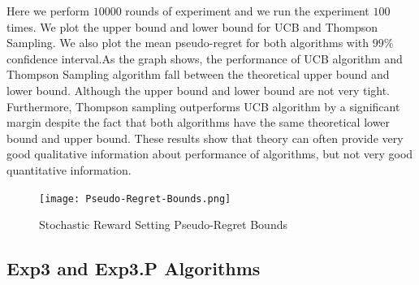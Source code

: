 \documentclass[12pt]{article}
\begin{document}
Here we perform $10000$ rounds of experiment and we run the experiment $100$ times. We plot the upper bound and lower bound for UCB and Thompson Sampling. We also plot the mean pseudo-regret for both algorithms with $99$\% confidence interval.As the graph shows, the performance of UCB algorithm and Thompson Sampling algorithm fall between the theoretical upper bound and lower bound. Although the upper bound and lower bound are not very tight. Furthermore, Thompson sampling outperforms UCB algorithm by a significant margin despite the fact that both algorithms have the same theoretical lower bound and upper bound. These results show that theory can often provide very good qualitative information about performance of algorithms, but not very good quantitative information.

\begin{figure}[tb]
  \texttt{[image: Pseudo-Regret-Bounds.png]}
  \captionsetup{justification=centering}
  \caption{Stochastic Reward Setting Pseudo-Regret Bounds}
\end{figure}

\subsection{Exp3 and Exp3.P Algorithms}
\end{document}
